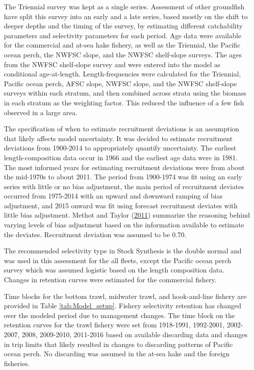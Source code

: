 \documentclass[12pt,]{article}
\begin{document}
The Triennial survey was kept as a single series. Assessment of other
groundfish have split this survey into an early and a late series, based
mostly on the shift to deeper depths and the timing of the survey, by
estimating different catchability parameters and selectivity parameters
for each period. Age data were available for the commercial and at-sea
hake fishery, as well as the Triennial, the Pacific ocean perch, the
NWFSC slope, and the NWFSC shelf-slope surveys. The ages from the NWFSC
shelf-slope survey and were entered into the model as conditional
age-at-length. Length-frequencies were calculated for the Triennial,
Pacific ocean perch, AFSC slope, NWFSC slope, and the NWFSC shelf-slope
surveys within each stratum, and then combined across strata using the
biomass in each stratum as the weighting factor. This reduced the
influence of a few fish observed in a large area.

The specification of when to estimate recruitment deviations is an
assumption that likely affects model uncertainty. It was decided to
estimate recruitment deviations from 1900-2014 to appropriately quantify
uncertainty. The earliest length-composition data occur in 1966 and the
earliest age data were in 1981. The most informed years for estimating
recruitment deviations were from about the mid-1970s to about 2011. The
period from 1900-1974 was fit using an early series with little or no
bias adjustment, the main period of recruitment deviates occurred from
1975-2014 with an upward and downward ramping of bias adjustment, and
2015 onward was fit using forecast recruitment deviates with little bias
adjustment. Methot and Taylor
(\protect\hyperlink{ref-methot_adjusting_2011}{2011}) summarize the
reasoning behind varying levels of bias adjustment based on the
information available to estimate the deviates. Recruitment deviation
was assumed to be 0.70.

The recommended selectivity type in Stock Synthesis is the double normal
and was used in this assessment for the all fleets, except the Pacific
ocean perch survey which was assumed logistic based on the length
composition data. Changes in retention curves were estimated for the
commercial fishery.

Time blocks for the bottom trawl, midwater trawl, and hook-and-line
fishery are provided in Table \ref{tab:Model_setup}. Fishery selectivity
retention has changed over the modeled period due to management changes.
The time block on the retention curves for the trawl fishery were set
from 1918-1991, 1992-2001, 2002-2007, 2008, 2009-2010, 2011-2016 based
on available discarding data and changes in trip limits that likely
resulted in changes to discarding patterns of Pacific ocean perch. No
discarding was assumed in the at-sea hake and the foreign fisheries.
\end{document}
